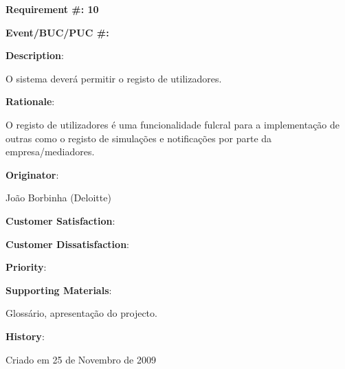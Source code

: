 \pagebreak

\begin{minipage}{0.55\textwidth}
\begin{flushleft}\textbf{Requirement \#: 10}\end{flushleft}
\end{minipage}
\begin{minipage}{0.4\textwidth}
\begin{flushright}\textbf{Event/BUC/PUC \#:}\end{flushright}
\end{minipage}

\begin{description}
\item \textbf{Description}:

O sistema deverá permitir o registo de utilizadores.\\

\item \textbf{Rationale}:

O registo de utilizadores é uma funcionalidade fulcral para a implementação de outras como o registo de simulações e notificações por parte da empresa/mediadores.\\

\item \textbf{Originator}:

João Borbinha (Deloitte)\\

\begin{minipage}{0.45\textwidth}
\begin{flushleft}\item \textbf{Customer Satisfaction}:\end{flushleft}
\end{minipage}
\begin{minipage}{0.45\textwidth}
\begin{flushleft}\item \textbf{Customer Dissatisfaction}:\end{flushleft}
\end{minipage}

\item \textbf{Priority}:\\

\item \textbf{Supporting Materials}:

Glossário, apresentação do projecto.\\

\item \textbf{History}:

Criado em 25 de Novembro de 2009\\
\end{description}

